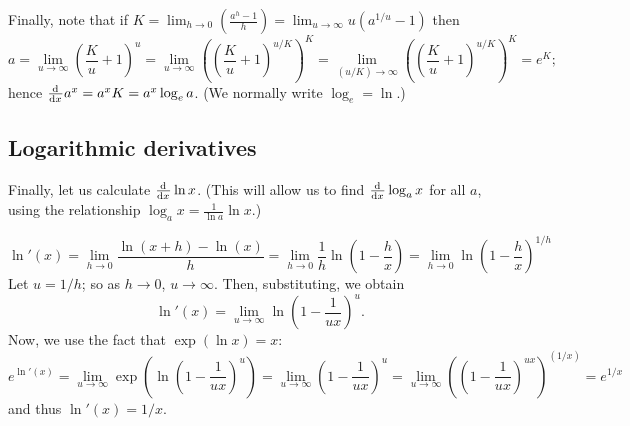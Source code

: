 Finally, note that if $ K = \lim_{h \to 0} \left( \frac{a^h - 1}{h} \right) = \lim_{u \to \infty} u(a^{1/u} - 1) $ then
\begin{displaymath}
  a = \lim_{u \to \infty} \left(\frac{K}{u} + 1\right)^u = \lim_{u \to \infty} \left(\left(\frac{K}{u} + 1\right)^{u/K}\right)^K = \lim_{(u/K) \to \infty} \left(\left(\frac{K}{u} + 1\right)^{u/K}\right)^K = e^K;
\end{displaymath}
hence $ \od{}{x} a^x = a^x K = a^x \log_e a $. (We normally write $ \log_e = \ln $.)

\subsection{Logarithmic derivatives}
Finally, let us calculate $ \od{}{x} \ln x $. (This will allow us to find $ \od{}{x} \log_a x $ for all $ a $, using the
relationship $ \log_a x = \frac{1}{\ln a} \ln x $.)

\begin{displaymath}
  \ln'(x) = \lim_{h \to 0} \frac{\ln(x + h) - \ln(x)}{h} = \lim_{h \to 0} \frac{1}{h} \ln\left(1 - \frac{h}{x} \right) = \lim_{h \to 0} \ln\left(1 - \frac{h}{x} \right)^{1/h}
\end{displaymath}
Let $ u = 1/h $; so as $ h \to 0 $, $ u \to \infty $. Then, substituting, we obtain
\begin{displaymath}
  \ln'(x) = \lim_{u \to \infty} \ln \left( 1 - \frac{1}{ux} \right)^u.
\end{displaymath}
Now, we use the fact that $ \exp(\ln x) = x $:
\begin{displaymath}
  e^{\ln'(x)} = \lim_{u \to \infty} \exp(\ln \left( 1 - \frac{1}{ux} \right)^u) = \lim_{u \to \infty}\left( 1 - \frac{1}{ux} \right)^u
              = \lim_{u \to \infty} \left(\left( 1 - \frac{1}{ux} \right)^{ux}\right)^{(1/x)}
              = e^{1/x}
\end{displaymath}
and thus $ \ln'(x) = 1/x $.


